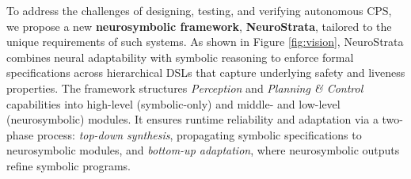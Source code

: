 To address the challenges of designing, testing, and verifying autonomous CPS, we propose a new \textbf{neurosymbolic framework}, \textbf{NeuroStrata}, tailored to the unique requirements of such systems. As shown in Figure \ref{fig:vision}, NeuroStrata combines neural adaptability with symbolic reasoning to enforce formal specifications across hierarchical DSLs that capture underlying safety and liveness properties. The framework structures \textit{Perception} and \textit{Planning \& Control} capabilities into high-level (symbolic-only) and middle- and low-level (neurosymbolic) modules. It ensures runtime reliability and adaptation via a two-phase process: \textit{top-down synthesis}, propagating symbolic specifications to neurosymbolic modules, and \textit{bottom-up adaptation}, where neurosymbolic outputs refine symbolic programs.





